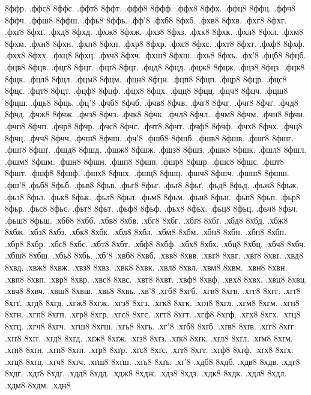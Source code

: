 {8ффр.
.ффс8
8ффс.
.ффт8
8ффт.
.ффф8
8ффф.
.ффх8
8ффх.
.ффц8
8ффц.
.ффч8
8ффч.
.ффш8
8ффш.
.ффь8
8ффь.
.фф'8
.фхб8
8фхб.
.фхв8
8фхв.
.фхг8
8фхг.
.фхґ8
8фхґ.
.фхд8
8фхд.
.фхж8
8фхж.
.фхз8
8фхз.
.фхк8
8фхк.
.фхл8
8фхл.
.фхм8
8фхм.
.фхн8
8фхн.
.фхп8
8фхп.
.фхр8
8фхр.
.фхс8
8фхс.
.фхт8
8фхт.
.фхф8
8фхф.
.фхх8
8фхх.
.фхц8
8фхц.
.фхч8
8фхч.
.фхш8
8фхш.
.фхь8
8фхь.
.фх'8
.фцб8
8фцб.
.фцв8
8фцв.
.фцг8
8фцг.
.фцґ8
8фцґ.
.фцд8
8фцд.
.фцж8
8фцж.
.фцз8
8фцз.
.фцк8
8фцк.
.фцл8
8фцл.
.фцм8
8фцм.
.фцн8
8фцн.
.фцп8
8фцп.
.фцр8
8фцр.
.фцс8
8фцс.
.фцт8
8фцт.
.фцф8
8фцф.
.фцх8
8фцх.
.фцц8
8фцц.
.фцч8
8фцч.
.фцш8
8фцш.
.фць8
8фць.
.фц'8
.фчб8
8фчб.
.фчв8
8фчв.
.фчг8
8фчг.
.фчґ8
8фчґ.
.фчд8
8фчд.
.фчж8
8фчж.
.фчз8
8фчз.
.фчк8
8фчк.
.фчл8
8фчл.
.фчм8
8фчм.
.фчн8
8фчн.
.фчп8
8фчп.
.фчр8
8фчр.
.фчс8
8фчс.
.фчт8
8фчт.
.фчф8
8фчф.
.фчх8
8фчх.
.фчц8
8фчц.
.фчч8
8фчч.
.фчш8
8фчш.
.фч'8
.фшб8
8фшб.
.фшв8
8фшв.
.фшг8
8фшг.
.фшґ8
8фшґ.
.фшд8
8фшд.
.фшж8
8фшж.
.фшз8
8фшз.
.фшк8
8фшк.
.фшл8
8фшл.
.фшм8
8фшм.
.фшн8
8фшн.
.фшп8
8фшп.
.фшр8
8фшр.
.фшс8
8фшс.
.фшт8
8фшт.
.фшф8
8фшф.
.фшх8
8фшх.
.фшц8
8фшц.
.фшч8
8фшч.
.фшш8
8фшш.
.фш'8
.фьб8
8фьб.
.фьв8
8фьв.
.фьг8
8фьг.
.фьґ8
8фьґ.
.фьд8
8фьд.
.фьж8
8фьж.
.фьз8
8фьз.
.фьк8
8фьк.
.фьл8
8фьл.
.фьм8
8фьм.
.фьн8
8фьн.
.фьп8
8фьп.
.фьр8
8фьр.
.фьс8
8фьс.
.фьт8
8фьт.
.фьф8
8фьф.
.фьх8
8фьх.
.фьц8
8фьц.
.фьч8
8фьч.
.фьш8
8фьш.
.хбб8
8хбб.
.хбв8
8хбв.
.хбг8
8хбг.
.хбґ8
8хбґ.
.хбд8
8хбд.
.хбж8
8хбж.
.хбз8
8хбз.
.хбк8
8хбк.
.хбл8
8хбл.
.хбм8
8хбм.
.хбн8
8хбн.
.хбп8
8хбп.
.хбр8
8хбр.
.хбс8
8хбс.
.хбт8
8хбт.
.хбф8
8хбф.
.хбх8
8хбх.
.хбц8
8хбц.
.хбч8
8хбч.
.хбш8
8хбш.
.хбь8
8хбь.
.хб'8
.хвб8
8хвб.
.хвв8
8хвв.
.хвг8
8хвг.
.хвґ8
8хвґ.
.хвд8
8хвд.
.хвж8
8хвж.
.хвз8
8хвз.
.хвк8
8хвк.
.хвл8
8хвл.
.хвм8
8хвм.
.хвн8
8хвн.
.хвп8
8хвп.
.хвр8
8хвр.
.хвс8
8хвс.
.хвт8
8хвт.
.хвф8
8хвф.
.хвх8
8хвх.
.хвц8
8хвц.
.хвч8
8хвч.
.хвш8
8хвш.
.хвь8
8хвь.
.хв'8
.хгб8
8хгб.
.хгв8
8хгв.
.хгг8
8хгг.
.хгґ8
8хгґ.
.хгд8
8хгд.
.хгж8
8хгж.
.хгз8
8хгз.
.хгк8
8хгк.
.хгл8
8хгл.
.хгм8
8хгм.
.хгн8
8хгн.
.хгп8
8хгп.
.хгр8
8хгр.
.хгс8
8хгс.
.хгт8
8хгт.
.хгф8
8хгф.
.хгх8
8хгх.
.хгц8
8хгц.
.хгч8
8хгч.
.хгш8
8хгш.
.хгь8
8хгь.
.хг'8
.хґб8
8хґб.
.хґв8
8хґв.
.хґг8
8хґг.
.хґґ8
8хґґ.
.хґд8
8хґд.
.хґж8
8хґж.
.хґз8
8хґз.
.хґк8
8хґк.
.хґл8
8хґл.
.хґм8
8хґм.
.хґн8
8хґн.
.хґп8
8хґп.
.хґр8
8хґр.
.хґс8
8хґс.
.хґт8
8хґт.
.хґф8
8хґф.
.хґх8
8хґх.
.хґц8
8хґц.
.хґч8
8хґч.
.хґш8
8хґш.
.хґь8
8хґь.
.хґ'8
.хдб8
8хдб.
.хдв8
8хдв.
.хдг8
8хдг.
.хдґ8
8хдґ.
.хдд8
8хдд.
.хдж8
8хдж.
.хдз8
8хдз.
.хдк8
8хдк.
.хдл8
8хдл.
.хдм8
8хдм.
.хдн8
}
